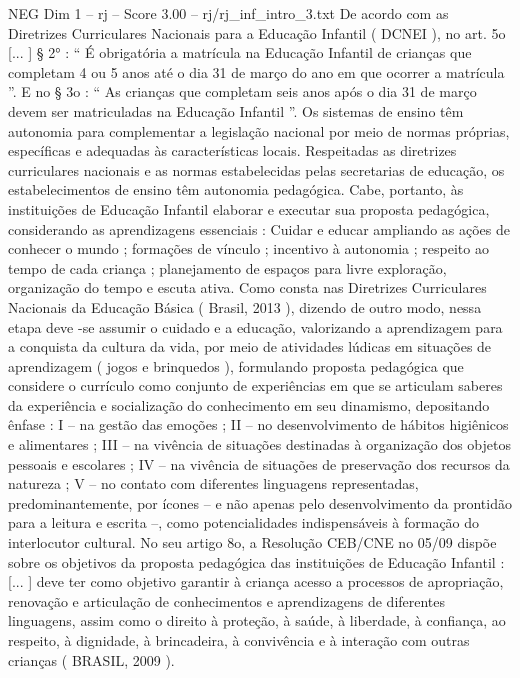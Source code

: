 \begin{textsample}{NEG Dim 1 – rj – Score 3.00 – rj/rj\_inf\_intro\_3.txt}
De acordo com as Diretrizes Curriculares Nacionais para a Educação Infantil ( DCNEI ), no art. 5o [... ] § 2{\EmojiFont °} : “ É obrigatória a matrícula na Educação Infantil de crianças que completam 4 ou 5 anos até o dia 31 de março do ano em que ocorrer a matrícula ”.
E no § 3o : “ As crianças que completam seis anos após o dia 31 de março devem ser matriculadas na Educação Infantil ”.
Os sistemas de ensino têm autonomia para complementar a legislação nacional por meio de normas próprias, específicas e adequadas às características locais.
Respeitadas as diretrizes curriculares nacionais e as normas estabelecidas pelas secretarias de educação, os estabelecimentos de ensino têm autonomia pedagógica.
Cabe, portanto, às instituições de Educação Infantil elaborar e executar sua proposta pedagógica, considerando as aprendizagens essenciais : Cuidar e educar ampliando as ações de conhecer o mundo ; formações de vínculo ; incentivo à autonomia ; respeito ao tempo de cada criança ; planejamento de espaços para livre exploração, organização do tempo e escuta ativa.
Como consta nas Diretrizes Curriculares Nacionais da Educação Básica ( Brasil, 2013 ), dizendo de outro modo, nessa etapa deve -se assumir o cuidado e a educação, valorizando a aprendizagem para a conquista da cultura da vida, por meio de atividades lúdicas em situações de aprendizagem ( jogos e brinquedos ), formulando proposta pedagógica que considere o currículo como conjunto de experiências em que se articulam saberes da experiência e socialização do conhecimento em seu dinamismo, depositando ênfase : I – na gestão das emoções ; II – no desenvolvimento de hábitos higiênicos e alimentares ; III – na vivência de situações destinadas à organização dos objetos pessoais e escolares ; IV – na vivência de situações de preservação dos recursos da natureza ; V – no contato com diferentes linguagens representadas, predominantemente, por ícones – e não apenas pelo desenvolvimento da prontidão para a leitura e escrita –, como potencialidades indispensáveis à formação do interlocutor cultural.
No seu artigo 8o, a Resolução CEB/CNE no 05/09 dispõe sobre os objetivos da proposta pedagógica das instituições de Educação Infantil : [... ] deve ter como objetivo garantir à criança acesso a processos de apropriação, renovação e articulação de conhecimentos e aprendizagens de diferentes linguagens, assim como o direito à proteção, à saúde, à liberdade, à confiança, ao respeito, à dignidade, à brincadeira, à convivência e à interação com outras crianças ( BRASIL, 2009 ).

\end{textsample}
